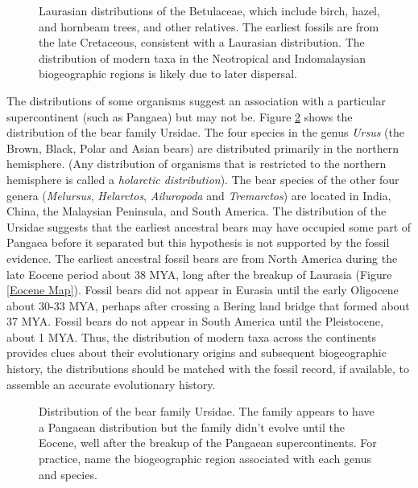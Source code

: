 \documentclass[11pt, oneside]{article}   	%
\begin{document}
\begin{figure}[tb]
	\centering
		\caption{Laurasian distributions of the Betulaceae, which include birch, hazel, and hornbeam trees, and other relatives. The earliest fossils are from the late Cretaceous, consistent with a Laurasian distribution. The distribution of modern taxa in the Neotropical and Indomalaysian biogeographic regions is likely due to later dispersal.\label{Betulaceae Map}}
		
\end{figure}
 
The distributions of some organisms suggest an association with a particular supercontinent (such as Pangaea) but may not be. Figure \ref{Bear Distribution} shows the distribution of the bear family Ursidae.  The four species in the genus \emph{Ursus} (the Brown, Black, Polar and Asian bears) are distributed primarily in the northern hemisphere. (Any distribution of organisms that is restricted to the northern hemisphere is called a \emph{holarctic distribution}).  The bear species of the other four genera (\emph{Melursus}, \emph{Helarctos}, \emph{Ailuropoda} and \emph{Tremarctos}) are located in India, China, the Malaysian Peninsula, and South America. The distribution of the Ursidae suggests that the earliest ancestral bears may have occupied some part of Pangaea before it separated but this hypothesis is not supported by the fossil evidence. The earliest ancestral fossil bears are from North America during the late Eocene period about 38 MYA, long after the breakup of Laurasia (Figure \ref{Eocene Map}). Fossil bears did not appear in Eurasia until the early Oligocene about 30-33 MYA, perhaps after crossing a Bering land bridge that formed about 37 MYA.  Fossil bears do not appear in South America until the Pleistocene, about 1 MYA.  Thus, the distribution of modern taxa across the continents provides clues about their evolutionary origins and subsequent biogeographic history, the distributions should be matched with the fossil record, if available, to assemble an accurate evolutionary history.  

\begin{figure}[tb]
	\centering
		\caption{Distribution of the bear family Ursidae. The family appears to have a Pangaean distribution but the family didn't evolve until the Eocene, well after the breakup of the Pangaean supercontinents. For practice, name the biogeographic region associated with each genus and species.\label{Bear Distribution}}
		
\end{figure}
\end{document}
